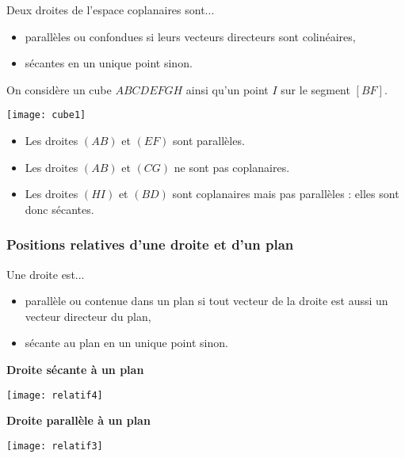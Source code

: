 \documentclass[11pt,fleqn, openany]{book} %
\begin{document}
\begin{proposition}Deux droites de l'espace coplanaires sont...
\begin{itemize}
\item parallèles ou confondues si leurs vecteurs directeurs sont colinéaires,
\item sécantes en un unique point sinon.
\end{itemize}\end{proposition}


\begin{example}On considère un cube $ABCDEFGH$ ainsi qu'un point $I$ sur le segment $[BF]$.

\begin{minipage}{0.4\linewidth}
\texttt{[image: cube1]}

\end{minipage}\begin{minipage}{0.6 \linewidth}
\begin{itemize}
\item Les droites $(AB)$ et $(EF)$ sont parallèles.
\item Les droites $(AB)$ et $(CG)$ ne sont pas coplanaires.
\item Les droites $(HI)$ et $(BD)$ sont coplanaires mais pas parallèles : elles sont donc sécantes.
\end{itemize}
\end{minipage}

\end{example}



\subsubsection{Positions relatives d'une droite et d'un plan}

\begin{proposition}Une droite est...
\begin{itemize}
\item parallèle ou contenue dans un plan si tout vecteur de la droite est aussi un vecteur directeur du plan,
\item sécante au plan en un unique point sinon.
\end{itemize}\end{proposition}

\begin{minipage}{0.45\linewidth}\begin{center}
\textbf{Droite sécante à un plan}
\end{center}
\begin{center}
\texttt{[image: relatif4]}
\end{center}
\end{minipage}\hfill \begin{minipage}{0.45\linewidth}\begin{center}
\textbf{Droite parallèle à un plan}
\end{center}
\begin{center}
\texttt{[image: relatif3]}
\end{center}
\end{minipage}
\end{document}
